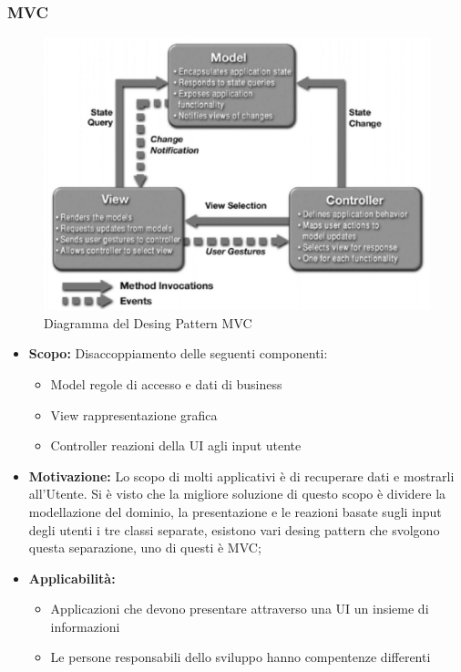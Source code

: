 \documentclass[a4paper]{article}
\begin{document}
	\subsubsection{MVC}
				\begin{figure}[H]
					\centering
					\includegraphics[scale=0.65]{immagini/ST/schemaMVC.jpg}
					\caption{Diagramma del Desing Pattern MVC}
				\end{figure}
            \begin{itemize}
				\item \textbf{Scopo:}
					Disaccoppiamento delle seguenti componenti:
					\begin{itemize}
						\item Model regole di accesso e dati di business
						\item View rappresentazione grafica
						\item Controller reazioni della UI agli input utente
					\end{itemize}
                \item \textbf{Motivazione:}
                	Lo scopo di molti applicativi è di recuperare dati e mostrarli all'Utente. Si è visto che la migliore soluzione di questo scopo è dividere la modellazione del dominio, la presentazione e le reazioni basate sugli input degli utenti i tre classi separate, esistono vari desing pattern che svolgono questa separazione, uno di questi è MVC; 
                \item \textbf{Applicabilità:}
					\begin{itemize}
						\item Applicazioni che devono presentare attraverso una UI un insieme di informazioni
						\item Le persone responsabili dello sviluppo hanno compentenze differenti
					\end{itemize}
                	 		
			\end{itemize}
\end{document}
